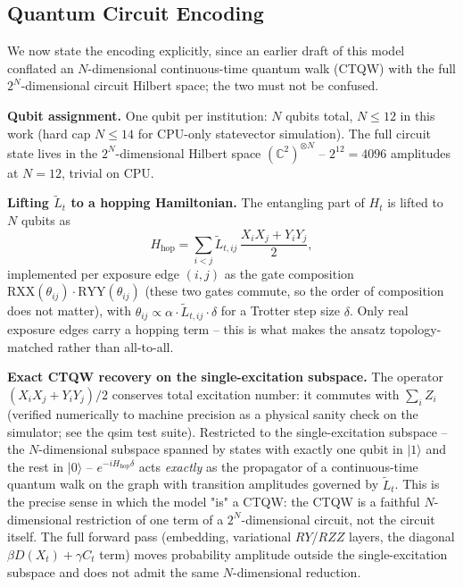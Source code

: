 \documentclass[journal]{IEEEtran}
\begin{document}
\subsection{Quantum Circuit Encoding}
\label{sec:circuit}

We now state the encoding explicitly, since an earlier draft of this
model conflated an $N$-dimensional continuous-time quantum walk (CTQW)
with the full $2^N$-dimensional circuit Hilbert space; the two must not be
confused.

\textbf{Qubit assignment.} One qubit per institution: $N$ qubits total,
$N \le 12$ in this work (hard cap $N \le 14$ for CPU-only statevector
simulation). The full circuit state lives in the $2^N$-dimensional
Hilbert space $(\mathbb{C}^2)^{\otimes N}$ -- $2^{12} = 4096$ amplitudes
at $N=12$, trivial on CPU.

\textbf{Lifting $\tilde{L}_t$ to a hopping Hamiltonian.} The
entangling part of $H_t$ is lifted to $N$ qubits as
\begin{equation}
  H_{\mathrm{hop}} = \sum_{i<j} \tilde{L}_{t,ij}\,\frac{X_i X_j + Y_i Y_j}{2},
\end{equation}
implemented per exposure edge $(i,j)$ as the gate composition
$\mathrm{RXX}(\theta_{ij}) \cdot \mathrm{RYY}(\theta_{ij})$ (these two
gates commute, so the order of composition does not matter), with
$\theta_{ij} \propto \alpha \cdot \tilde{L}_{t,ij} \cdot \delta$ for a
Trotter step size $\delta$. Only real exposure edges carry a hopping term
-- this is what makes the ansatz topology-matched rather than
all-to-all.

\textbf{Exact CTQW recovery on the single-excitation subspace.} The
operator $(X_iX_j+Y_iY_j)/2$ conserves total excitation number: it
commutes with $\sum_i Z_i$ (verified numerically to machine precision as
a physical sanity check on the simulator; see the qsim test suite).
Restricted to the single-excitation subspace -- the $N$-dimensional
subspace spanned by states with exactly one qubit in $\lvert 1 \rangle$
and the rest in $\lvert 0 \rangle$ -- $e^{-i H_{\mathrm{hop}} \delta}$
acts \emph{exactly} as the propagator of a continuous-time quantum walk
on the graph with transition amplitudes governed by $\tilde{L}_t$. This
is the precise sense in which the model "is" a CTQW: the CTQW is a
faithful $N$-dimensional restriction of one term of a $2^N$-dimensional
circuit, not the circuit itself. The full forward pass (embedding,
variational $RY$/$RZZ$ layers, the diagonal $\beta D(X_t) + \gamma C_t$
term) moves probability amplitude outside the single-excitation subspace
and does not admit the same $N$-dimensional reduction.
\end{document}
